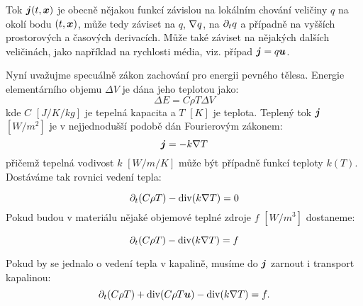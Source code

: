Tok $\mathbf{\boldsymbol{j}}(t,\mathbf{\boldsymbol{x}})$ je obecně nějakou funkcí závislou na lokálním chování veličiny $q$ na okolí bodu $(t, \mathbf{\boldsymbol{x}})$, může tedy záviset na 
$q$, $\nabla q$, na $\partial_t q$ a případně na vyšších prostorových a časových derivacích. 
Může také záviset na nějakých dalších veličinách, jako například na rychlosti média, viz. případ $\mathbf{\boldsymbol{j}} = q\mathbf{\boldsymbol{u}}$.

Nyní uvažujme specuálně zákon zachování pro energii pevného tělesa. Energie elementárního objemu $\Delta V$ je dána jeho teplotou jako:
\[
    \Delta E =  C \rho T\Delta V 
\]
kde $C$ $[J/K/kg]$ je tepelná kapacita a $T$ $[K]$ je teplota. Teplený tok $\mathbf{\boldsymbol{j}}$ $[W/m^2]$ je v nejjednodušší podobě dán
Fourierovým zákonem:
\[
    \mathbf{\boldsymbol{j}} = -k\nabla T
\]
přičemž tepelná vodivost $k$ $[W/m/K]$ může být případně funkcí teploty $k(T)$. Dostáváme tak rovnici vedení tepla:

\[
   \partial_t (C \rho T) - \operatorname{div} ( k \nabla T) = 0
\]
Pokud budou v materiálu nějaké objemové teplné zdroje $f$ $[W/m^3]$ dostaneme:

\[
   \partial_t (C \rho T) - \operatorname{div} ( k \nabla T) = f
\]

Pokud by se jednalo o vedení tepla v kapalině, musíme do $\mathbf{\boldsymbol{j}}$ zarnout i transport kapalinou:
\[
   \partial_t (C \rho T) + \operatorname{div} (C \rho T \mathbf{\boldsymbol{u}}) - \operatorname{div}( k \nabla T) = f.
\]

